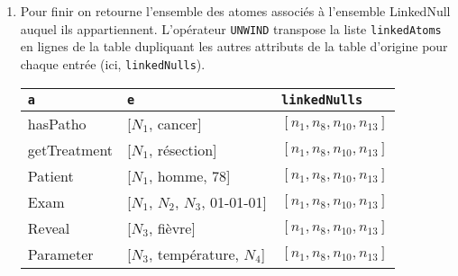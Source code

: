 \begin{example}
\begin{enumerate}[label=\emph{Etape~\arabic*},leftmargin=*]
		\item Pour finir on retourne l'ensemble des atomes associés à l'ensemble \textsf{LinkedNull} auquel ils appartiennent.
		      L'opérateur \verb|UNWIND| transpose la liste \verb|linkedAtoms| en lignes de la table dupliquant les autres attributs de la table d'origine pour chaque entrée (ici, \verb|linkedNulls|).
		      \begin{center}
			      \begin{tabular}{lll}
				      \hline
				      \verb|a|     & \verb|e|                        & \verb|linkedNulls|               \\
				      \hline
				      hasPatho     & [$N_1$, cancer]                 & $[n_{1}, n_{8}, n_{10}, n_{13}]$ \\
				      getTreatment & [$N_1$, résection]              & $[n_{1}, n_{8}, n_{10}, n_{13}]$ \\
				      Patient      & [$N_1$, homme, 78]              & $[n_{1}, n_{8}, n_{10}, n_{13}]$ \\
				      Exam         & [$N_1$, $N_2$, $N_3$, 01-01-01] & $[n_{1}, n_{8}, n_{10}, n_{13}]$ \\
				      Reveal       & [$N_3$, fièvre]                 & $[n_{1}, n_{8}, n_{10}, n_{13}]$ \\
				      Parameter    & [$N_3$, température, $N_4$]     & $[n_{1}, n_{8}, n_{10}, n_{13}]$ \\
				      \hline
			      \end{tabular}
		      \end{center}
	\end{enumerate}
\end{example}


